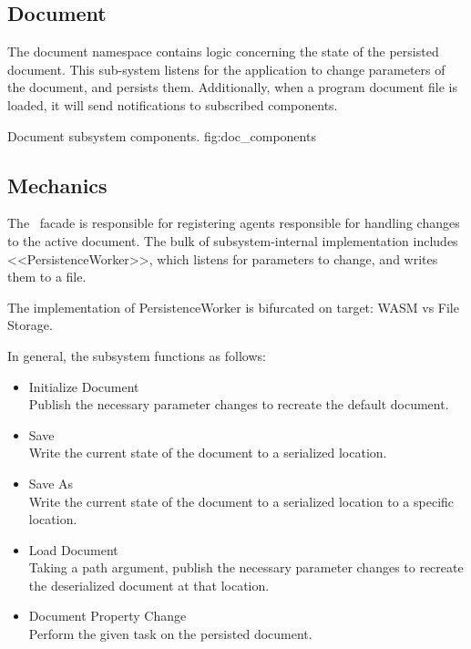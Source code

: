 \newcommand{\docarea}[3]{
    \index{#1}\pbodyitem{#2}{#3}
}

\newcommand{\extparamref}[3]{
    \index{#1}\pbodyitem{#2}{#3}
}

\subsection{Document}
The document namespace contains logic concerning the state of the persisted document.
This sub-system listens for the application to change parameters of the document, and persists them.
Additionally, when a program document file is loaded, it will send notifications to subscribed components.

{Document subsystem components.}
{fig:doc_components}

\subsection{Mechanics}
The \dmod\ facade is responsible for registering agents responsible for handling changes to the active document.
The bulk of subsystem-internal implementation includes <<PersistenceWorker>>, which listens for parameters to change, and writes them to a file.

The implementation of PersistenceWorker is bifurcated on target: WASM vs File Storage.

In general, the subsystem functions as follows:
\begin{itemize}
    \item Initialize Document \\
          Publish the necessary parameter changes to recreate the default document.
    \item Save \\
          Write the current state of the document to a serialized location.
    \item Save As \\
          Write the current state of the document to a serialized location to a specific location.
    \item Load Document \\
          Taking a path argument, publish the necessary parameter changes to recreate the deserialized document at that location.
    \item Document Property Change \\
          Perform the given task on the persisted document.
\end{itemize}

